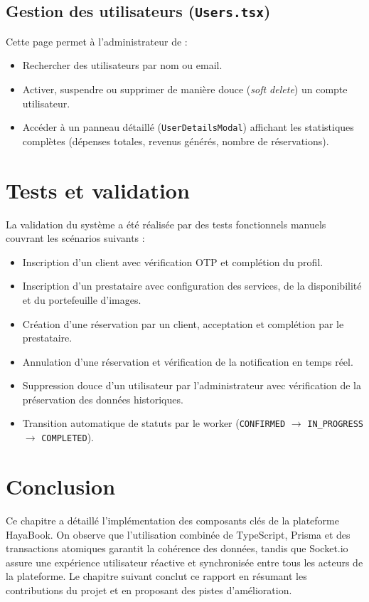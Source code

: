 \subsection{Gestion des utilisateurs (\texttt{Users.tsx})}

Cette page permet à l'administrateur de :
\begin{itemize}
    \item Rechercher des utilisateurs par nom ou email.
    \item Activer, suspendre ou supprimer de manière douce (\textit{soft delete}) un compte utilisateur.
    \item Accéder à un panneau détaillé (\texttt{UserDetailsModal}) affichant les statistiques complètes (dépenses totales, revenus générés, nombre de réservations).
\end{itemize}

\section{Tests et validation}

La validation du système a été réalisée par des tests fonctionnels manuels couvrant les scénarios suivants :

\begin{itemize}
    \item Inscription d'un client avec vérification OTP et complétion du profil.
    \item Inscription d'un prestataire avec configuration des services, de la disponibilité et du portefeuille d'images.
    \item Création d'une réservation par un client, acceptation et complétion par le prestataire.
    \item Annulation d'une réservation et vérification de la notification en temps réel.
    \item Suppression douce d'un utilisateur par l'administrateur avec vérification de la préservation des données historiques.
    \item Transition automatique de statuts par le worker (\texttt{CONFIRMED} $\rightarrow$ \texttt{IN\_PROGRESS} $\rightarrow$ \texttt{COMPLETED}).
\end{itemize}

\section{Conclusion}

Ce chapitre a détaillé l'implémentation des composants clés de la plateforme HayaBook. On observe que l'utilisation combinée de TypeScript, Prisma et des transactions atomiques garantit la cohérence des données, tandis que Socket.io assure une expérience utilisateur réactive et synchronisée entre tous les acteurs de la plateforme. Le chapitre suivant conclut ce rapport en résumant les contributions du projet et en proposant des pistes d'amélioration.
